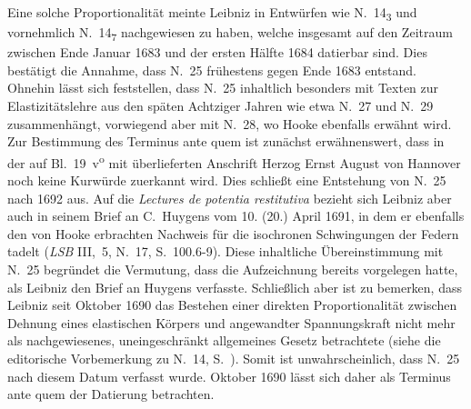 \begin{ledgroup}
Eine solche Proportionalität meinte Leibniz in Entwürfen wie N.~14\textsubscript{3} und vornehmlich N.~14\textsubscript{7} nachgewiesen zu haben, welche insgesamt auf den Zeitraum zwischen Ende Januar 1683 und der ersten Hälfte 1684 datierbar sind.
Dies bestätigt die Annahme, dass N.~25 frühestens gegen Ende 1683 entstand.
Ohnehin lässt sich feststellen, dass N.~25 inhaltlich besonders mit Texten zur Elastizitätslehre aus den späten Achtziger Jahren wie etwa N.~27 und  N.~29 zusammenhängt, vorwiegend aber mit N.~28, wo Hooke ebenfalls erwähnt wird.
\pend%
\pstart%
Zur Bestimmung des Terminus ante quem ist zunächst erwähnenswert, dass in der auf Bl.~19~v\textsuperscript{o} mit überlieferten Anschrift Herzog Ernst August von Hannover noch keine Kurwürde zuerkannt wird.
Dies schließt eine Entstehung von N.~25 nach 1692 aus.
Auf die \cite{01241}\textit{Lectures de potentia restitutiva} bezieht sich Leibniz aber auch in seinem Brief an C.~Huygens vom 10. (20.) April 1691, in dem er ebenfalls den von Hooke erbrachten Nachweis für die isochronen Schwingungen der Federn tadelt (\cite{01243}\textit{LSB} III,~5, N.~17, S.~100.6-9).
Diese inhaltliche Übereinstimmung mit N.~25 begründet die Vermutung,
dass die Aufzeichnung bereits vorgelegen hatte, als Leibniz den Brief an Huygens verfasste.
Schließlich aber ist zu bemerken, dass Leibniz seit Oktober 1690 das Bestehen einer direkten Proportionalität zwischen Dehnung eines elastischen Körpers und angewandter Spannungskraft nicht mehr als nachgewiesenes, uneingeschränkt allgemeines Gesetz betrachtete (siehe die editorische Vorbemerkung zu N.~14, S.~).
Somit ist unwahrscheinlich, dass N.~25 nach diesem Datum verfasst wurde.
Oktober 1690 lässt sich daher als Terminus ante quem der Datierung betrachten.%
\protect{}%
\protect{}%
\protect{}%
\protect{}%
\protect{}
\pend
\end{ledgroup}
%
%
\frenchspacing%
%
%
\newpage%
%
